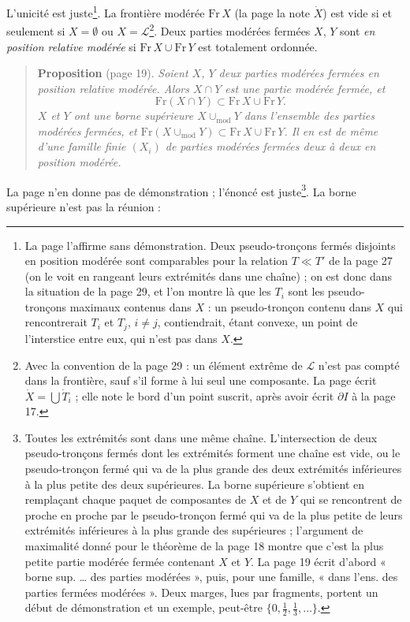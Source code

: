 \documentclass[11pt,a4paper]{article}
\begin{document}
L'unicité est juste\footnote{La page l'affirme sans démonstration. Deux
pseudo-tronçons fermés disjoints en position modérée sont comparables pour la
relation $T \ll T'$ de la page 27 (on le voit en rangeant leurs extrémités dans
une chaîne) ; on est donc dans la situation de la page 29, et l'on montre là
que les $T_{i}$ sont les pseudo-tronçons maximaux contenus dans $X$ : un
pseudo-tronçon contenu dans $X$ qui rencontrerait $T_{i}$ et $T_{j}$, $i \neq
j$, contiendrait, étant convexe, un point de l'interstice entre eux, qui n'est
pas dans $X$.}. La frontière modérée $\mathrm{Fr}\, X$ (la page la note
$\dot{X}$) est vide si et seulement si $X = \emptyset$ ou $X =
\mathcal{L}$\footnote{Avec la convention de la page 29 : un élément extrême de
$\mathcal{L}$ n'est pas compté dans la frontière, sauf s'il forme à lui seul
une composante. La page écrit $\dot{X} = \bigcup \dot{T}_{i}$ ; elle note le
bord d'un point suscrit, après avoir écrit $\partial I$ à la page 17.}. Deux
parties modérées fermées $X$, $Y$ sont \emph{en position relative modérée} si
$\mathrm{Fr}\, X \cup \mathrm{Fr}\, Y$ est totalement ordonnée.

\begin{quote}
\textbf{Proposition} (page 19). \emph{Soient $X$, $Y$ deux parties modérées
fermées en position relative modérée. Alors $X \cap Y$ est une partie modérée
fermée, et}
\[
\mathrm{Fr}(X \cap Y) \subset \mathrm{Fr}\, X \cup \mathrm{Fr}\, Y .
\]
\emph{$X$ et $Y$ ont une borne supérieure $X \cup_{\mathrm{mod}} Y$ dans
l'ensemble des parties modérées fermées, et $\mathrm{Fr}(X \cup_{\mathrm{mod}}
Y) \subset \mathrm{Fr}\, X \cup \mathrm{Fr}\, Y$. Il en est de même d'une famille
finie $(X_{i})$ de parties modérées fermées deux à deux en position modérée.}
\end{quote}

La page n'en donne pas de démonstration ; l'énoncé est juste\footnote{Toutes
les extrémités sont dans une même chaîne. L'intersection de deux
pseudo-tronçons fermés dont les extrémités forment une chaîne est vide, ou le
pseudo-tronçon fermé qui va de la plus grande des deux extrémités inférieures à
la plus petite des deux supérieures. La borne supérieure s'obtient en
remplaçant chaque paquet de composantes de $X$ et de $Y$ qui se rencontrent de
proche en proche par le pseudo-tronçon fermé qui va de la plus petite de leurs
extrémités inférieures à la plus grande des supérieures ; l'argument de
maximalité donné pour le théorème de la page 18 montre que c'est la plus petite
partie modérée fermée contenant $X$ et $Y$. La page 19 écrit d'abord « borne
sup. \dots{} des parties modérées », puis, pour une famille, « dans l'ens. des
parties fermées modérées ». Deux marges, lues par fragments, portent un début
de démonstration et un exemple, peut-être $\{0, \frac{1}{2}, \frac{1}{3},
\dots\}$.}. La borne supérieure n'est pas la réunion :
\end{document}
